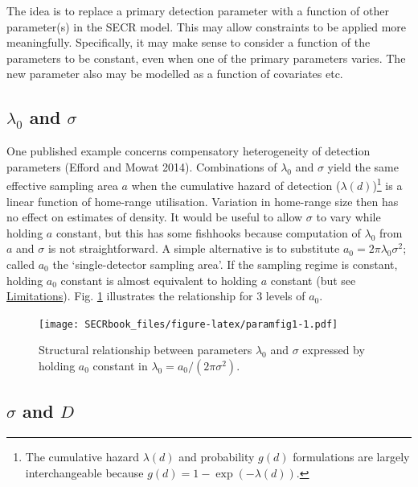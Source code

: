 \documentclass[
]{book}
\begin{document}
The idea is to replace a primary detection parameter with a function of other parameter(s) in the SECR model. This may allow constraints to be applied more meaningfully. Specifically, it may make sense to consider a function of the parameters to be constant, even when one of the primary parameters varies. The new parameter also may be modelled as a function of covariates etc.

\subsection{\texorpdfstring{\(\lambda_0\) and \(\sigma\)}{\textbackslash lambda\_0 and \textbackslash sigma}}\label{lambda_0-and-sigma}


One published example concerns compensatory heterogeneity of detection parameters (Efford and Mowat 2014). Combinations of \(\lambda_0\) and \(\sigma\) yield the same effective sampling area \(a\) when the cumulative hazard of detection (\(\lambda(d)\))\footnote{The cumulative hazard \(\lambda(d)\) and probability \(g(d)\) formulations are largely interchangeable because \(g(d) = 1 - \exp(-\lambda(d))\).} is a linear function of home-range utilisation. Variation in home-range size then has no effect on estimates of density. It would be useful to allow \(\sigma\) to vary while holding \(a\) constant, but this has some fishhooks because computation of \(\lambda_0\) from \(a\) and \(\sigma\) is not straightforward. A simple alternative is to substitute \(a_0 = 2 \pi \lambda_0 \sigma^2\); \citet{em14} called \(a_0\) the `single-detector sampling area'. If the sampling regime is constant, holding \(a_0\) constant is almost equivalent to holding \(a\) constant (but see \hyperref[paramlimitations]{Limitations}). Fig. \ref{fig:paramfig1} illustrates the relationship for 3 levels of \(a_0\).



\begin{figure}
\centering
\texttt{[image: SECRbook\_files/figure-latex/paramfig1-1.pdf]}
\caption{\label{fig:paramfig1}Structural relationship between parameters \(\lambda_0\) and \(\sigma\) expressed by holding \(a_0\) constant in \(\lambda_0 = a_0 / (2 \pi \sigma^2)\).}
\end{figure}

\subsection{\texorpdfstring{\(\sigma\) and \(D\)}{\textbackslash sigma and D}}\label{sigma-and-d}
\end{document}
